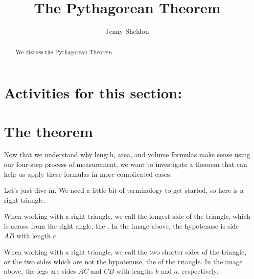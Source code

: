 \documentclass{ximera}
\title{The Pythagorean Theorem}
\author{Jenny Sheldon}
\begin{document}
\begin{abstract}
We discuss the Pythagorean Theorem.
\end{abstract}
\maketitle

\section{Activities for this section:} 



\section{The theorem}
Now that we understand why length, area, and volume formulas make sense using our four-step process of measurement, we want to investigate a theorem that can help us apply these formulas in more complicated cases.


Let's just dive in. We need a little bit of terminology to get started, so here is a right triangle.
\begin{image}
\end{image}
\begin{definition}
When working with a right triangle, we call the longest side of the triangle, which is across from the right angle, the . In the image above, the hypotenuse is side $AB$ with length $c$.

When working with a right triangle, we call the two shorter sides of the triangle, or the two sides which are not the hypotenuse, the  of the triangle. In the image above, the legs are sides $AC$ and $CB$ with lengths $b$ and $a$, respectively.
\end{definition}
\end{document}
